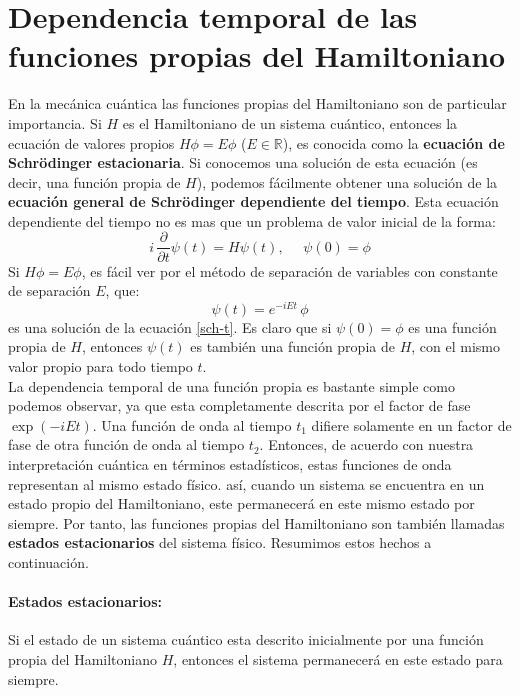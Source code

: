 \documentclass[12pt]{book}
\numberwithin{equation}{chapter}
\def\R{\mathbb{R}}
\begin{document}
\section{Dependencia temporal de las funciones propias del Hamiltoniano}
En la mec\'anica cu\'antica las funciones propias del Hamiltoniano son de particular importancia. Si $H$ es el Hamiltoniano de un sistema cu\'antico, entonces la ecuaci\'on de valores propios $ H \phi = E \phi $ ($E \in \R$), es conocida como la {\bf ecuaci\'on de Schr\"odinger estacionaria}. Si conocemos una soluci\'on de esta ecuaci\'on (es decir, una funci\'on propia de $H$), podemos f\'acilmente obtener una soluci\'on de la {\bf ecuaci\'on general de Schr\"odinger dependiente del tiempo}. Esta ecuaci\'on dependiente del tiempo no es mas que un problema de valor inicial de la forma:
\begin{equation}\label{sch-t}
i\, \frac{\partial}{\partial t} \psi (t)= H \psi(t),\,\,\,\,\,\,\,\, \psi(0)= \phi
\end{equation}
Si $H\phi = E \phi$, es f\'acil ver por el m\'etodo de separaci\'on de variables con constante de separaci\'on $E$, que:
\begin{equation}
\psi (t)=e^{-iEt} \, \phi
\end{equation}
es una soluci\'on de la ecuaci\'on \eqref{sch-t}. Es claro que si $\psi (0) = \phi$ es una funci\'on propia de $H$, entonces $\psi(t)$ es tambi\'en una funci\'on propia de $H$, con el mismo valor propio para todo tiempo $t$.\\

La dependencia temporal de una funci\'on propia es bastante simple como podemos observar, ya que esta completamente descrita por el factor de fase $\exp(-iEt)$. Una funci\'on de onda al tiempo $t_{1}$ difiere solamente en un factor de fase de otra funci\'on de onda al tiempo $t_{2}$. Entonces, de acuerdo con nuestra interpretaci\'on cu\'antica en t\'erminos estad\'isticos, estas funciones de onda representan al mismo estado f\'isico. as\'i, cuando un sistema se encuentra en un estado propio del Hamiltoniano, este permanecer\'a en este mismo estado por siempre. Por tanto, las funciones propias del Hamiltoniano son tambi\'en llamadas {\bf estados estacionarios} del sistema f\'isico. Resumimos estos hechos a continuaci\'on.   
  
\paragraph{Estados estacionarios:} Si el estado de un sistema cu\'antico esta descrito inicialmente por una funci\'on propia del Hamiltoniano $H$, entonces el sistema permanecer\'a en este estado para siempre.\\
\end{document}
